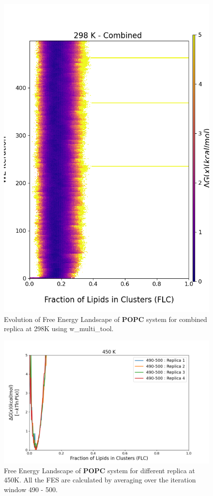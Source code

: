 \documentclass{biophys-new}
\begin{document}
\begin{figure}[hbt!]
\centering
\includegraphics[width=0.8\linewidth]{all_plots/ClusterLipids2Total/DPPC_POPC_CHOL/298K/Evolution_POPC_MULTI__298_ClusterLipids2Total.png}
\caption{Evolution of Free Energy Landscape of \textbf{POPC} system for combined replica at 298K using w\_multi\_tool.}
\label{fig:view}

\end{figure}


\begin{figure}[hbt!]
\centering
\includegraphics[width=1.1\linewidth]{all_plots/ClusterLipids2Total/DPPC_POPC_CHOL/450K/Average_POPC_450_ClusterLipids2Total.png}
\caption{Free Energy Landscape of \textbf{POPC} system for different replica at 450K. All the FES are calculated by averaging over the iteration window 490 - 500.}
\label{fig:view}

\end{figure}
\end{document}
